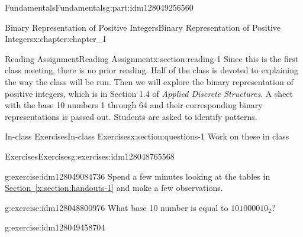 \documentclass[oneside,10pt,]{book}
\newcommand{\xreffont}{\relax}
\numberwithin{equation}{section}
\begin{document}
\begin{partptx}{Fundamentals}{}{Fundamentals}{}{}{g:part:idm128049256560}
%
\typeout{************************************************}
\typeout{************************************************}
%
\begin{chapterptx}{Binary Representation of Positive Integers}{}{Binary Representation of Positive Integers}{}{}{x:chapter:chapter_1}
%
%
%
\typeout{************************************************}
\typeout{************************************************}
%
\begin{sectionptx}{Reading Assignment}{}{Reading Assignment}{}{}{x:section:reading-1}
Since this is the first class meeting, there is no prior reading.  Half of the class is devoted to explaining the way the class will be run.  Then we will explore the binary representation of positive integers, which is in Section 1.4 of \emph{Applied Discrete Structures}.  A sheet with the base 10 numbers 1 through 64 and their corresponding binary representations is passed out.  Students are asked to identify patterns.%
\end{sectionptx}
%
%
\typeout{************************************************}
\typeout{************************************************}
%
\begin{sectionptx}{In-class Exercises}{}{In-class Exercises}{}{}{x:section:questions-1}
Work on these in class%
%
%
\typeout{************************************************}
\typeout{************************************************}
%
\begin{exercises-subsection}{Exercises}{}{Exercises}{}{}{g:exercises:idm128048765568}
\par\medskip\noindent%
%
\begin{exercisegroup}
\begin{divisionexerciseeg}{1}{}{}{g:exercise:idm128049084736}%
Spend a few minutes looking at the tables in \hyperref[x:section:handouts-1]{Section~{\xreffont\ref{x:section:handouts-1}}} and make a few observations.%
\end{divisionexerciseeg}%
\begin{divisionexerciseeg}{2}{}{}{g:exercise:idm128048800976}%
What base 10 number is equal to \(101000010_2\)?%
\end{divisionexerciseeg}%
\begin{divisionexerciseeg}{3}{}{}{g:exercise:idm128049458704}%

\end{divisionexerciseeg}
\end{exercisegroup}
\end{exercises-subsection}
\end{sectionptx}
\end{chapterptx}
\end{partptx}
\end{document}
